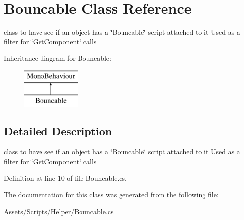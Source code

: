 \hypertarget{class_bouncable}{}\section{Bouncable Class Reference}
\label{class_bouncable}


class to have see if an object has a \char`\"{}\+Bouncable\char`\"{} script attached to it Used as a filter for \char`\"{}\+Get\+Component\char`\"{} calls  


Inheritance diagram for Bouncable\+:\begin{figure}[H]
\begin{center}
\leavevmode
\includegraphics[height=2.000000cm]{class_bouncable}
\end{center}
\end{figure}


\subsection{Detailed Description}
class to have see if an object has a \char`\"{}\+Bouncable\char`\"{} script attached to it Used as a filter for \char`\"{}\+Get\+Component\char`\"{} calls 



Definition at line 10 of file Bouncable.\+cs.



The documentation for this class was generated from the following file\+:\begin{DoxyCompactItemize}
\item 
Assets/\+Scripts/\+Helper/\mbox{\hyperlink{_bouncable_8cs}{Bouncable.\+cs}}\end{DoxyCompactItemize}
